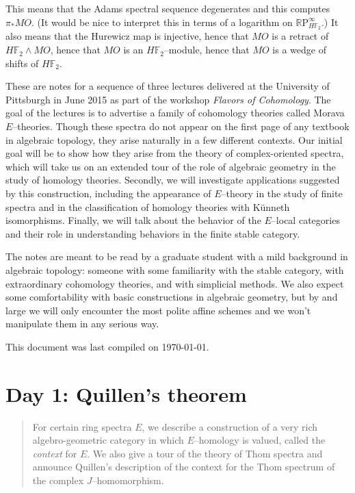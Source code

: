 \documentclass{amsart}
\newcommand{\F}{\mathbb F}
\newcommand{\R}{\mathbb R}
\newcommand{\RP}{\R\mathrm P}
\newcommand{\<}{\langle}
\renewcommand{\>}{\rangle}
\newcommand{\sm}{\wedge}
\theoremstyle{plain}
\theoremstyle{definition}
\theoremstyle{remark}
\begin{document}
This means that the Adams spectral sequence degenerates and this computes $\pi_* MO$.  (It would be nice to interpret this in terms of a logarithm on $\RP^\infty_{H\F_2}$.)  It also means that the Hurewicz map is injective, hence that $MO$ is a retract of $H\F_2 \sm MO$, hence that $MO$ is an $H\F_2$--module, hence that $MO$ is a wedge of shifts of $H\F_2$.



\newpage



These are notes for a sequence of three lectures delivered at the University of Pittsburgh in June 2015 as part of the workshop \textit{Flavors of Cohomology}.  The goal of the lectures is to advertise a family of cohomology theories called Morava $E$--theories.  Though these spectra do not appear on the first page of any textbook in algebraic topology, they arise naturally in a few different contexts.  Our initial goal will be to show how they arise from the theory of complex-oriented spectra, which will take us on an extended tour of the role of algebraic geometry in the study of homology theories.  Secondly, we will investigate applications suggested by this construction, including the appearance of $E$--theory in the study of finite spectra and in the classification of homology theories with K\"unneth isomorphisms.  Finally, we will talk about the behavior of the $E$--local categories and their role in understanding behaviors in the finite stable category.

The notes are meant to be read by a graduate student with a mild background in algebraic topology: someone with some familiarity with the stable category, with extraordinary cohomology theories, and with simplicial methods.  We also expect some comfortability with basic constructions in algebraic geometry, but by and large we will only encounter the most polite affine schemes and we won't manipulate them in any serious way.

This document was last compiled on \today.









\newpage
\section{Day 1: Quillen's theorem}

\begin{abstract}
For certain ring spectra $E$, we describe a construction of a very rich algebro-geometric category in which $E$--homology is valued, called the \textit{context} for $E$.  We also give a tour of the theory of Thom spectra and announce Quillen's description of the context for the Thom spectrum of the complex $J$--homomorphism.
\end{abstract}
\end{document}

